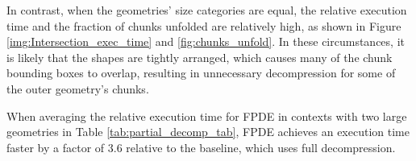 In contrast, when the geometries' size categories are equal, the relative execution time and the fraction of chunks unfolded are relatively high, as shown in Figure \ref{img:Intersection_exec_time} and \ref{fig:chunks_unfold}. In these circumstances, it is likely that the shapes are tightly arranged, which causes many of the chunk bounding boxes to overlap, resulting in unnecessary decompression for some of the outer geometry's chunks. 

When averaging the relative execution time for FPDE in contexts with two large geometries in Table \ref{tab:partial_decomp_tab}, FPDE achieves an execution time faster by a factor of 3.6 relative to the baseline, which uses full decompression.


\begin{table}[htbp]
\centering
{}
\caption{Table with the relative difference of the mean execution time for FPDE in relation to the baseline, along with the percentage of time spent on partial decompression versus the intersection operation for FPDE and the baseline.}
\label{tab:partial_decomp_tab}
\end{table}

